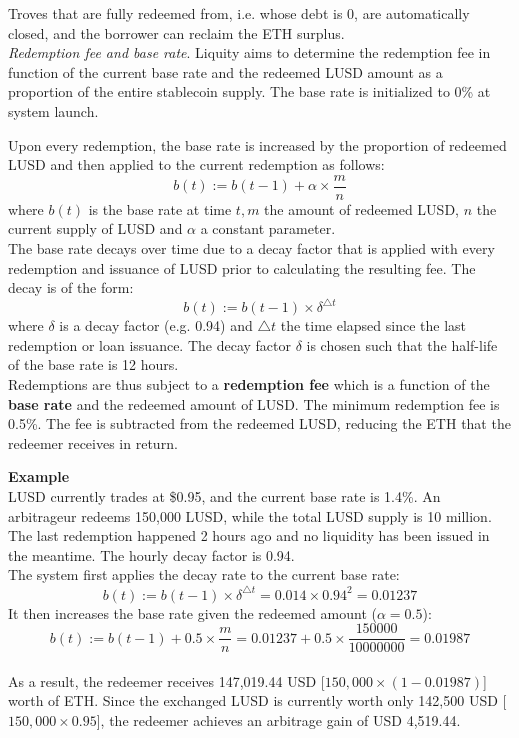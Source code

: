 \documentclass{article}
\begin{document}
Troves that are fully redeemed from, i.e. whose debt is 0, are automatically closed, and the borrower can reclaim the ETH surplus.\\

\textit{Redemption fee and base rate}. Liquity aims to determine the redemption fee in function of the current base rate and the redeemed LUSD amount as a proportion of the entire stablecoin supply. The base rate is initialized to 0\% at system launch.

Upon every redemption, the base rate is increased by the proportion of redeemed LUSD and then applied to the current redemption as follows:
$$b(t):=b(t-1)+\alpha\times\frac{m}{n}$$
where $b(t)$ is the base rate at time $t,m$ the amount of redeemed LUSD, $n$ the current supply of LUSD and $\alpha$ a constant parameter.\\

The base rate decays over time due to a decay factor that is applied with every redemption and issuance of LUSD prior to calculating the resulting fee. The decay is of the form:
$$b(t):=b(t-1)\times\delta^{\triangle t}$$
where $\delta$ is a decay factor (e.g. 0.94) and $\triangle t$ the time elapsed since the last redemption or loan issuance. The decay factor $\delta$ is chosen such that the half-life of the base rate is 12 hours. \\

Redemptions are thus subject to a \textbf{redemption fee} which is a function of the \textbf{base rate} and the redeemed amount of LUSD. The minimum redemption fee is 0.5\%. The fee is subtracted from the redeemed LUSD, reducing the ETH that the redeemer receives in return.\\
\begin{tcolorbox}
\textbf{Example}\\
LUSD currently trades at \$0.95, and the current base rate is 1.4\%. An arbitrageur redeems 150,000 LUSD, while the total LUSD supply is 10 million. The last redemption happened 2 hours ago and no liquidity has been issued in the meantime. The hourly decay factor is 0.94.\\

The system first applies the decay rate to the current base rate:
$$b(t):=b(t-1)\times\delta^{\triangle t}=0.014\times0.94^2=0.01237$$
It then increases the base rate given the redeemed amount ($\alpha= 0.5$):
$$b(t):=b(t-1)+0.5\times\frac{m}{n}=0.01237+0.5\times\frac{150000}{10000000}=0.01987$$
\\

As a result, the redeemer receives 147,019.44 USD [$150,000 \times (1 - 0.01987)$] worth of ETH. Since the exchanged LUSD is currently worth only 142,500 USD [$150,000 \times 0.95$], the redeemer achieves an arbitrage gain of USD 4,519.44.
\end{tcolorbox}
\end{document}
